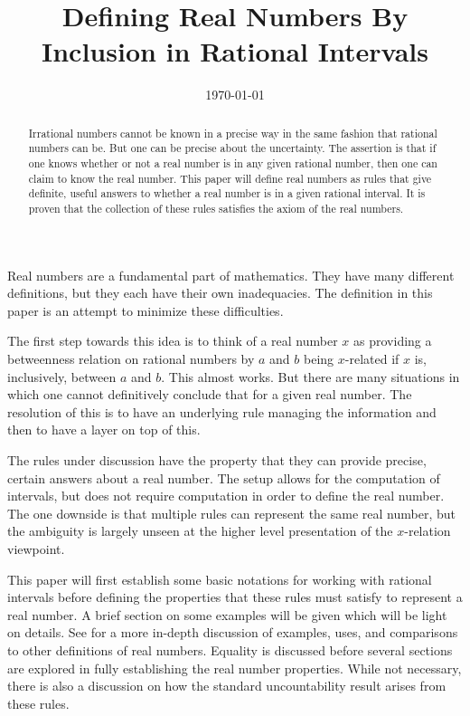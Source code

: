 \documentclass[12pt]{article}
\title{Defining Real Numbers By Inclusion in Rational Intervals}
\date{\today}
\begin{document}
\maketitle
\begin{abstract}
Irrational numbers cannot be known in a precise way in the same fashion that rational numbers can be. But one can be precise about the uncertainty. The assertion is that if one knows whether or not a real number is in any given rational number, then one can claim to know the real number. This paper will define real numbers as rules that give definite, useful answers to whether a real number is in a given rational interval. It is proven that the collection of these rules satisfies the axiom of the real numbers. 
\end{abstract}

Real numbers are a fundamental part of mathematics. They have many different definitions, but they each have their own inadequacies. The definition in this paper is an attempt to minimize these difficulties. 

The first step towards this idea is to think of a real number $x$ as providing a betweenness relation on rational numbers by $a$ and $b$ being $x$-related if $x$ is, inclusively, between $a$ and $b$. This almost works. But there are many situations in which one cannot definitively conclude that for a given real number. The resolution of this is to have an underlying rule managing the information and then to have a layer on top of this. 

The rules under discussion have the property that they can provide precise, certain answers about a real number. The setup allows for the computation of intervals, but does not require computation in order to define the real number. The one downside is that multiple rules can represent the same real number, but the ambiguity is largely unseen at the higher level presentation of the $x$-relation viewpoint.  

This paper will first establish some basic notations for working with rational intervals before defining the properties that these rules must satisfy to represent a real number. A brief section on some examples will be given which will be light on details. See \cite{taylor23main} for a more in-depth discussion of examples, uses, and comparisons to other definitions of real numbers. Equality is discussed before several sections are explored in fully establishing the real number properties. While not necessary, there is also a discussion on how the standard uncountability result arises from these rules. 
\end{document}
